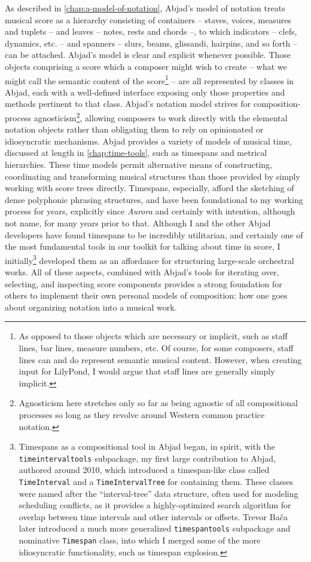 As described in \autoref{chap:a-model-of-notation}, Abjad's model of notation
treats musical score as a hierarchy consisting of containers -- staves, voices,
measures and tuplets -- and leaves -- notes, rests and chords --, to which
indicators -- clefs, dynamics, etc. -- and spanners -- slurs, beams, glissandi,
hairpins, and so forth -- can be attached. Abjad's model is clear and explicit
whenever possible. Those objects comprising a score which a composer might wish
to create -- what we might call the semantic content of the score\footnote{ As
opposed to those objects which are necessary or implicit, such as staff lines,
bar lines, measure numbers, etc. Of course, for some composers, staff lines can
and do represent semantic musical content. However, when creating input for
LilyPond, I would argue that staff lines are generally simply implicit. } --
are all represented by classes in Abjad, each with a well-defined interface
exposing only those properties and methods pertinent to that class. Abjad's
notation model strives for composition-process agnosticism\footnote{
Agnosticism here stretches only so far as being agnostic of all compositional
processes so long as they revolve around Western common practice notation. },
allowing composers to work directly with the elemental notation objects rather
than obligating them to rely on opinionated or idiosyncratic mechanisms. Abjad
provides a variety of models of musical time, discussed at length in
\autoref{chap:time-tools}, such as timespans and metrical hierarchies. These
time models permit alternative means of constructing, coordinating and
transforming musical structures than those provided by simply working with
score trees directly. Timespans, especially, afford the sketching of dense
polyphonic phrasing structures, and have been foundational to my working
process for years, explicitly since \emph{Aurora} and certainly with intention,
although not name, for many years prior to that. Although I and the other Abjad
developers have found timespans to be incredibly utilitarian, and certainly one
of the most fundamental tools in our toolkit for talking about time in score, I
initially\footnote{ Timespans as a compositional tool in Abjad began, in
spirit, with the \texttt{timeintervaltools} subpackage, my first large
contribution to Abjad, authored around 2010, which introduced a timespan-like
class called \texttt{TimeInterval} and a \texttt{TimeIntervalTree} for
containing them. These classes were named after the \enquote{interval-tree}
data structure, often used for modeling scheduling conflicts, as it provides a
highly-optimized search algorithm for overlap between time intervals and other
intervals or offsets. Trevor Ba\v{c}a later introduced a much more generalized
\texttt{timespantools} subpackage and nominative \texttt{Timespan} class, into
which I merged some of the more idiosyncratic functionality, such as timespan
explosion. } developed them as an affordance for structuring large-scale
orchestral works. All of these aspects, combined with Abjad's tools for
iterating over, selecting, and inspecting score components provides a strong
foundation for others to implement their own personal models of composition:
how one goes about organizing notation into a musical work.

